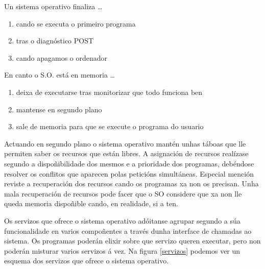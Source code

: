 \begin{diapo}\begin{frame}{Un sistema operativo finaliza  \dots}
\begin{enumerate}
\item cando se executa o primeiro programa\pause
\item tras o diagnóstico POST \pause
\item cando apagamos o ordenador 
\end{enumerate}
\end{frame} 
\end{diapo} 
\begin{diapo}\begin{frame}{ En canto o S.O. está en memoria   \dots}
\begin{enumerate}
	\item deixa de executarse tras monitorizar que todo funciona ben \pause
	\item mantense en segundo plano \pause
	\item sale de memoria para que se execute o programa do usuario 
\end{enumerate} \end{frame} \end{diapo}

Actuando en segundo plano o sistema operativo mantén unhas táboas que lle permiten saber os recursos que están libres.  A asignación de recursos realízase segundo a dispoñibilidade dos mesmos e a prioridade dos programas, debéndose resolver os conflitos que aparecen polas peticións simultáneas. Especial mención reviste a recuperación dos recursos cando os programas xa non os precisan. Unha mala recuperación de recursos pode facer que o SO considere que xa non lle queda memoria dispoñible cando, en realidade, si a ten.

Os servizos que ofrece o sistema operativo adóitanse agrupar segundo a súa funcionalidade en varios compoñentes a través dunha interface de chamadas ao sistema. Os programas poderán elixir sobre que servizo queren executar, pero non poderán misturar varios servizos á vez. Na figura \ref{servizos} podemos ver un esquema dos servizos que ofrece o sistema operativo.\\

